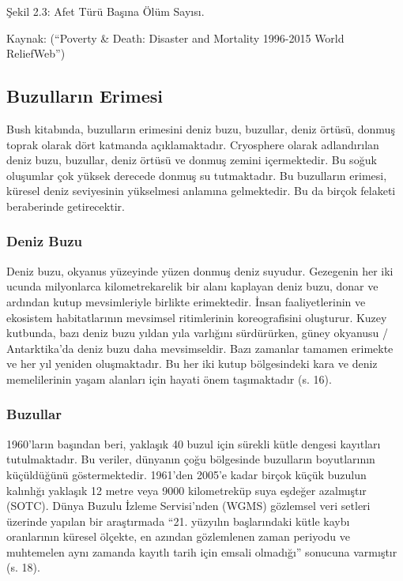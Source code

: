 \documentclass[
]{book}
\begin{document}
Şekil 2.3: Afet Türü Başına Ölüm Sayısı.

Kaynak: (``Poverty \& Death: Disaster and Mortality 1996-2015 World \textbar{} ReliefWeb'')

\hypertarget{buzullarux131n-erimesi}{%
\subsection{Buzulların Erimesi}\label{buzullarux131n-erimesi}}

Bush kitabında, buzulların erimesini deniz buzu, buzullar, deniz örtüsü, donmuş toprak olarak dört katmanda açıklamaktadır. Cryosphere olarak adlandırılan deniz buzu, buzullar, deniz örtüsü ve donmuş zemini içermektedir. Bu soğuk oluşumlar çok yüksek derecede donmuş su tutmaktadır. Bu buzulların erimesi, küresel deniz seviyesinin yükselmesi anlamına gelmektedir. Bu da birçok felaketi beraberinde getirecektir. \citep{bush2020}

\hypertarget{deniz-buzu}{%
\subsubsection{Deniz Buzu}\label{deniz-buzu}}

Deniz buzu, okyanus yüzeyinde yüzen donmuş deniz suyudur. Gezegenin her iki ucunda milyonlarca kilometrekarelik bir alanı kaplayan deniz buzu, donar ve ardından kutup mevsimleriyle birlikte erimektedir. İnsan faaliyetlerinin ve ekosistem habitatlarının mevsimsel ritimlerinin koreografisini oluşturur. Kuzey kutbunda, bazı deniz buzu yıldan yıla varlığını sürdürürken, güney okyanusu / Antarktika'da deniz buzu daha mevsimseldir. Bazı zamanlar tamamen erimekte ve her yıl yeniden oluşmaktadır. Bu her iki kutup bölgesindeki kara ve deniz memelilerinin yaşam alanları için hayati önem taşımaktadır (s. 16). \citep{bush2020}

\hypertarget{buzullar}{%
\subsubsection{Buzullar}\label{buzullar}}

1960'ların başından beri, yaklaşık 40 buzul için sürekli kütle dengesi kayıtları tutulmaktadır. Bu veriler, dünyanın çoğu bölgesinde buzulların boyutlarının küçüldüğünü göstermektedir. 1961'den 2005'e kadar birçok küçük buzulun kalınlığı yaklaşık 12 metre veya 9000 kilometreküp suya eşdeğer azalmıştır (SOTC).
Dünya Buzulu İzleme Servisi'nden (WGMS) gözlemsel veri setleri üzerinde yapılan bir araştırmada ``21. yüzyılın başlarındaki kütle kaybı oranlarının küresel ölçekte, en azından gözlemlenen zaman periyodu ve muhtemelen aynı zamanda kayıtlı tarih için emsali olmadığı'' sonucuna varmıştır (s. 18). \citep{bush2020}
\end{document}

